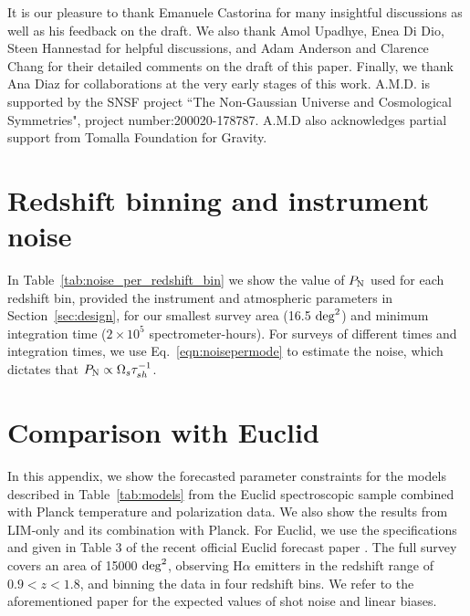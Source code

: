 \documentclass[twocolumn]{aastex631}
\begin{document}
\begin{acknowledgments}
It is our pleasure to thank Emanuele Castorina for many insightful discussions as well as his feedback on the draft. We also thank Amol Upadhye, Enea Di Dio, Steen Hannestad for helpful discussions, and Adam Anderson and Clarence Chang for their detailed comments on the draft of this paper. Finally, we thank Ana Diaz for collaborations at the very early stages of this work. A.M.D. is supported by the SNSF project ``The  Non-Gaussian  Universe and  Cosmological Symmetries", project number:200020-178787. A.M.D also acknowledges partial support from Tomalla Foundation for Gravity. 
\end{acknowledgments}


\vspace{.2in}
\appendix

\section{Redshift binning and instrument noise} \label{app:binning}
In Table~\ref{tab:noise_per_redshift_bin} we show the value of $P_{\rm N}$ used for each redshift bin, provided the instrument and atmospheric parameters in Section~\ref{sec:design}, for our smallest survey area (16.5 ${\rm deg}^2$) and minimum integration time ($2\times10^{5}$ spectrometer-hours). For surveys of different times and integration times, we use Eq.~\ref{eqn:noisepermode} to estimate the noise, which dictates that $P_{\rm N}\propto\Omega_{s}\tau_{sh}^{-1}$.   \vspace{.1in}

\section{Comparison with Euclid}\label{app:EUCLID_Comp}

In this appendix, we show the forecasted parameter constraints for the models described in Table~\ref{tab:models} from the Euclid spectroscopic sample combined with Planck temperature and polarization data. We also show the results from LIM-only and its combination with Planck. For Euclid, we use the specifications and given in Table 3 of the recent official Euclid forecast paper \citep{Blanchard:2019oqi}. The full survey covers an area of 15000 ${\rm deg}^2$, observing H$\alpha$ emitters in the redshift range of $0.9<z<1.8$, and binning the data in four redshift bins. We refer to the aforementioned paper for the expected values of shot noise and linear biases.
\end{document}
